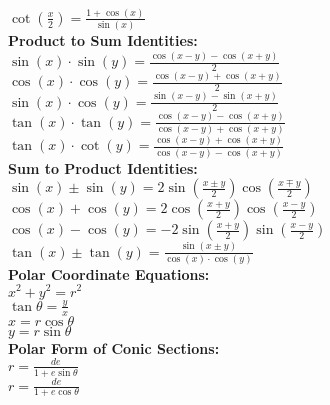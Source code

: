 \documentclass[12pt]{article}
\begin{document}
    \\ \( \cot \left( \displaystyle\frac{ x }{ 2 } \right) = \displaystyle\frac{ 1 + \cos( x ) }{ \sin( x ) } \)
\\ \textbf{Product to Sum Identities:}
    \\ \( \sin( x ) \cdot \sin( y ) = \displaystyle\frac{ \cos( x - y ) - \cos( x + y ) }{ 2 } \)
    \\ \( \cos( x ) \cdot \cos( y ) = \displaystyle\frac{ \cos( x - y ) + \cos( x + y ) }{ 2 } \)
    \\ \( \sin( x ) \cdot \cos( y ) = \displaystyle\frac{ \sin( x - y ) - \sin( x + y ) }{ 2 } \)
    \\ \( \tan( x ) \cdot \tan( y ) = \displaystyle\frac{ \cos( x - y ) - \cos( x + y ) }{ \cos( x - y ) + \cos( x + y ) } \)
    \\ \( \tan( x ) \cdot \cot( y ) = \frac{ \cos( x - y ) + \cos( x + y ) }{ \cos( x - y ) - \cos( x + y ) } \)
\\ \textbf{Sum to Product Identities:}
    \\ \( \sin( x ) \pm \sin( y ) = 2 \sin \left( \displaystyle\frac{ x \pm y }{ 2 } \right) \cos \left( \displaystyle\frac{ x \mp y }{ 2 } \right) \)
    \\ \( \cos( x ) + \cos( y ) = 2 \cos \left( \displaystyle\frac{ x + y }{ 2 } \right) \cos \left( \displaystyle\frac{ x - y }{ 2 } \right) \)
    \\ \( \cos( x ) - \cos( y ) = -2 \sin \left( \displaystyle\frac{ x + y }{ 2 } \right) \sin \left( \displaystyle\frac{ x - y }{ 2 } \right) \)
    \\ \( \tan( x ) \pm \tan( y ) = \frac{ \sin( x \pm y ) }{ \cos( x ) \cdot \cos( y ) } \)
\\ \textbf{Polar Coordinate Equations:}
    \\ \( x^2 + y^2 = r^2 \)
    \\ \( \tan \theta = \displaystyle\frac{ y }{ x } \)
    \\ \( x = r \cos \theta \)
    \\ \( y = r \sin \theta \)
\\ \textbf{Polar Form of Conic Sections:}
    \\ \( r = \displaystyle\frac{ de }{ 1 + e \sin \theta } \)
    \\ \( r = \displaystyle\frac{ de }{ 1 + e \cos \theta } \)
\end{document}
